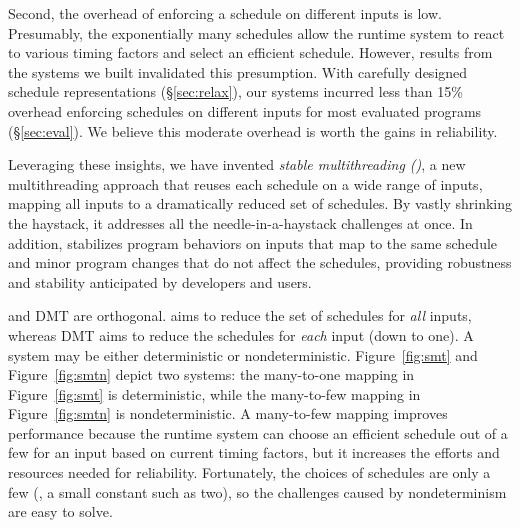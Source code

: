 
Second, the overhead of enforcing a schedule on different inputs is low.
Presumably, the exponentially many schedules allow the
runtime system to react to various timing factors and select an
efficient schedule.  However, results from the \smt systems we built
invalidated this presumption.  With carefully designed schedule
representations (\S\ref{sec:relax}), our systems incurred less than 15\%
overhead enforcing schedules on different inputs for most evaluated programs
(\S\ref{sec:eval}).  We believe this moderate overhead is worth the gains
in reliability.

Leveraging these insights, we have invented \emph{stable multithreading
  (\smt)}, a new multithreading approach that reuses each schedule on a wide
range of inputs, mapping all inputs to a dramatically reduced set of schedules.
By vastly shrinking the haystack, it addresses all the needle-in-a-haystack
challenges at once.  In addition, \smt stabilizes program behaviors
on inputs that map to the same schedule and minor program changes that
do not affect the schedules, providing robustness and stability
anticipated by developers and users.

\smt and DMT are orthogonal. \smt aims to reduce the set of schedules for
\emph{all} inputs, whereas DMT aims to reduce the schedules for \emph{each} input (down
to one).  A \smt system may be either deterministic or nondeterministic.
Figure~\ref{fig:smt} and Figure~\ref{fig:smtn} depict two \smt systems: the
many-to-one mapping in Figure~\ref{fig:smt} is deterministic, while the
many-to-few mapping in Figure~\ref{fig:smtn} is nondeterministic.  A
many-to-few mapping improves performance because the
runtime system can choose an efficient schedule out of a few for an input
based on current timing factors, but it increases the efforts and
resources needed for reliability.  Fortunately, the choices of schedules
are only a few (\eg, a small constant such as two), so the challenges
caused by nondeterminism are easy to solve.


